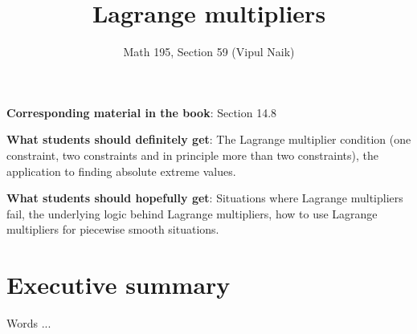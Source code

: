 \documentclass[10pt]{amsart}
\title{Lagrange multipliers}
\author{Math 195, Section 59 (Vipul Naik)}
\begin{document}
\maketitle

{\bf Corresponding material in the book}: Section 14.8

{\bf What students should definitely get}: The Lagrange multiplier
condition (one constraint, two constraints and in principle more than
two constraints), the application to finding absolute extreme values.

{\bf What students should hopefully get}: Situations where Lagrange
multipliers fail, the underlying logic behind Lagrange multipliers,
how to use Lagrange multipliers for piecewise smooth situations.
\section*{Executive summary}

Words ...
\end{document}
